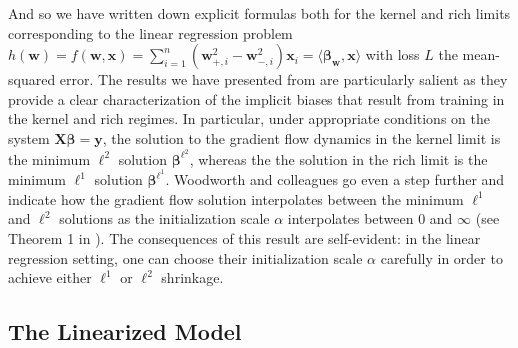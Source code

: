 \documentclass{article}
\begin{document}
And so we have written down explicit formulas both for the kernel and rich limits corresponding to the linear regression problem $h(\boldsymbol{w}) = f(\boldsymbol{w}, \boldsymbol{x}) = \sum_{i=1}^n(\boldsymbol{w}_{+, i}^2 - \boldsymbol{w}_{-, i}^2)\boldsymbol{x}_i = \langle \boldsymbol{\beta}_{\boldsymbol{w}}, \boldsymbol{x} \rangle $ with loss $L$ the mean-squared error. The results we have presented from \cite{woodworth2020kernel} are particularly salient as they provide a clear characterization of the implicit biases that result from training in the kernel and rich regimes. In particular, under appropriate conditions on the system $\boldsymbol{X} \boldsymbol{\beta} = \boldsymbol{y}$, the solution to the gradient flow dynamics in the kernel limit is the minimum $\ell^2$ solution $\boldsymbol{\beta}^{\ell^2}$, whereas the the solution in the rich limit is the minimum $\ell^1$ solution $\boldsymbol{\beta}^{\ell^1}$. Woodworth and colleagues go even a step further and indicate how the gradient flow solution interpolates between the minimum $\ell^1$ and $\ell^2 $ solutions as the initialization scale $\alpha$ interpolates between $0$ and $\infty$ (see Theorem 1 in \cite{woodworth2020kernel}). The consequences of this result are self-evident: in the linear regression setting, one can choose their initialization scale $\alpha$ carefully in order to achieve either $\ell^1$ or $\ell^2$ shrinkage.

\subsection{The Linearized Model}
\end{document}
